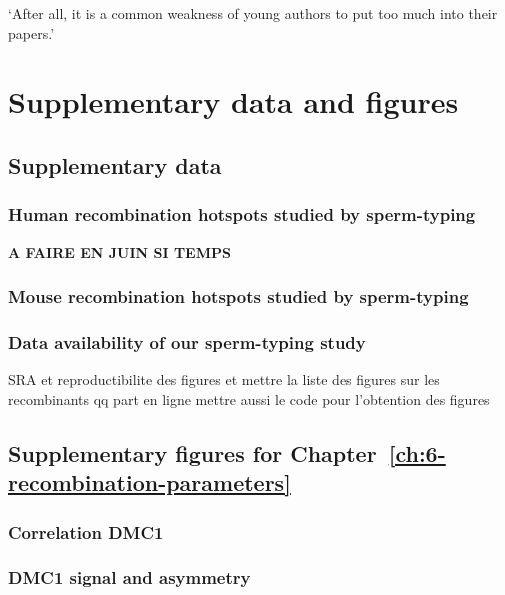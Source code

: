 \begin{savequote}[8cm]
‘After all, it is a common weakness of young authors to put too much into their papers.’

\end{savequote}

\chapter{\label{app:list-hostpots}Supplementary data and figures}

\minitoc{}

\section{Supplementary data}
\subsection{Human recombination hotspots studied by sperm-typing}
\textbf{A FAIRE EN JUIN SI TEMPS}
\subsection{Mouse recombination hotspots studied by sperm-typing}
\subsection{Data availability of our sperm-typing study}
SRA et reproductibilite des figures
et mettre la liste des figures sur les recombinants qq part en ligne
mettre aussi le code pour l'obtention des figures
\section{Supplementary figures for Chapter~\ref{ch:6-recombination-parameters}}
\subsection{Correlation DMC1}
\subsection{DMC1 signal and asymmetry}
